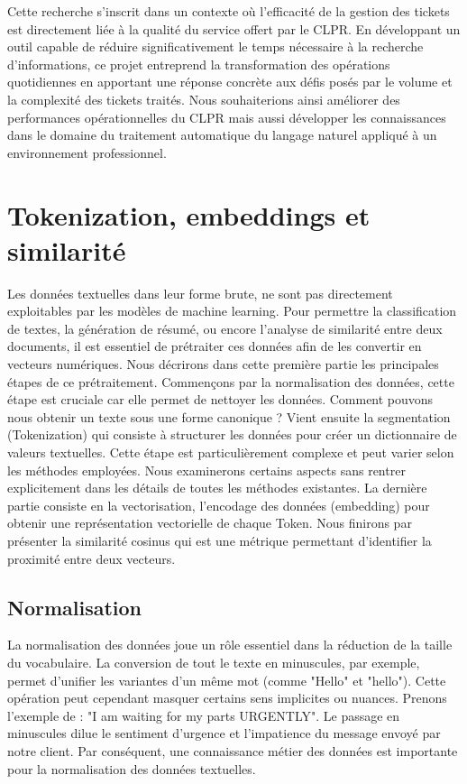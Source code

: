 \documentclass[12pt]{article}
\theoremstyle{definition}
\begin{document}
	Cette recherche s'inscrit dans un contexte où l'efficacité de la gestion des tickets est directement liée à la qualité du service offert par le CLPR. En développant un outil capable de réduire significativement le temps nécessaire à la recherche d'informations, ce projet entreprend la transformation des opérations quotidiennes en apportant une réponse concrète aux défis posés par le volume et la complexité des tickets traités. Nous souhaiterions ainsi améliorer des performances opérationnelles du CLPR mais aussi développer les connaissances dans le domaine du traitement automatique du langage naturel appliqué à un environnement professionnel.	

	
	\section{Tokenization, embeddings et similarité}
	Les données textuelles dans leur forme brute, ne sont pas directement exploitables par les modèles de machine learning. Pour permettre la classification de textes, la génération de résumé, ou encore l'analyse de similarité entre deux documents, il est essentiel de prétraiter ces données afin de les convertir en vecteurs numériques. Nous décrirons dans cette première partie les principales étapes de ce prétraitement. Commençons par la normalisation des données, cette étape est cruciale car elle permet de nettoyer les données. Comment pouvons nous obtenir un texte sous une forme canonique ? Vient ensuite la segmentation (Tokenization) qui consiste à structurer les données pour créer un dictionnaire de valeurs textuelles. Cette étape est particulièrement complexe et peut varier selon les méthodes employées. Nous examinerons certains aspects sans rentrer explicitement dans les détails de toutes les méthodes existantes. La dernière partie consiste en la vectorisation, l'encodage des données (embedding) pour obtenir une représentation vectorielle de chaque Token. Nous finirons par présenter la similarité cosinus qui est une métrique permettant d'identifier la proximité entre deux vecteurs.
	\subsection{Normalisation}
	La normalisation des données joue un rôle essentiel dans la réduction de la taille du vocabulaire. La conversion de tout le texte en minuscules, par exemple, permet d'unifier les variantes d'un même mot (comme "Hello" et "hello"). Cette opération peut cependant masquer certains sens implicites ou nuances. Prenons l'exemple de : "I am waiting for my parts URGENTLY". Le passage en minuscules dilue le sentiment d'urgence et l'impatience du message envoyé par notre client. Par conséquent, une connaissance métier des données est importante pour la normalisation des données textuelles.  
	
\end{document}
